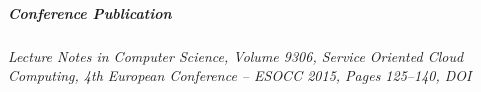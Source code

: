 
% 

\subparagraph*{Conference Publication}
\emph{Lecture Notes in Computer Science, Volume 9306, Service Oriented Cloud Computing, 4th European Conference -- ESOCC 2015, Pages 125--140, DOI 
}

% 









% 
% 

% 
